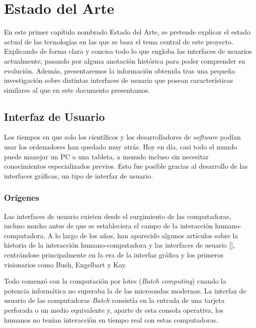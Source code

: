 \chapter{Estado del Arte}\label{chapter:state-of-the-art}

En este primer capítulo nombrado Estado del Arte, se pretende explicar el estado actual de las tecnologías en las que se basa el tema central de este proyecto. Explicando de forma clara y concisa todo lo que engloba las interfaces de usuarios actualmente, pasando por alguna anotación histórica para poder comprender su evolución. Además, presentaremos la información obtenida tras una pequeña investigación sobre distintas interfaces de usuario que posean características similares al que en este documento presentamos.

\section{Interfaz de Usuario}

Los tiempos en que solo los científicos y los desarrolladores de \textit{software} podían usar los ordenadores han quedado muy atrás. Hoy en día, casi todo el mundo puede manejar un PC o una tableta, a menudo incluso sin necesitar conocimientos especializados previos. Esto fue posible gracias al desarrollo de las interfaces gráficas, un tipo de interfaz de usuario.

\subsection{Orígenes}

Las interfaces de usuario existen desde el surgimiento de las computadoras, incluso mucho antes de que se estableciera el campo de la interacción humano-computadora. A lo largo de los años, han aparecido algunos artículos sobre la historia de la interacción humano-computadora y las interfaces de usuario [\cite{5,7}], centrándose principalmente en la era de la interfaz gráfica y los primeros visionarios como Bush, Engelbart y Kay.

Todo comenzó con la computación por lotes (\textit{Batch computing}) cuando la potencia informática no superaba la de las microondas modernas. La interfaz de usuario de las computadoras \textit{Batch} consistía en la entrada de una tarjeta perforada o un medio equivalente y, aparte de esta consola operativa, los humanos no tenían interacción en tiempo real con estas computadoras.

